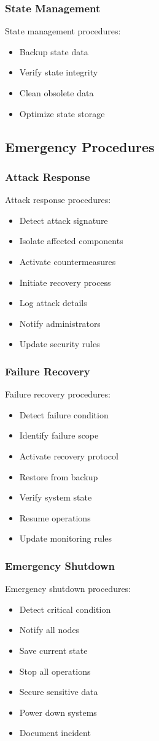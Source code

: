 \documentclass[12pt]{article}
\begin{document}
\subsubsection{State Management}
State management procedures:
\begin{itemize}
\item Backup state data
\item Verify state integrity
\item Clean obsolete data
\item Optimize state storage
\end{itemize}
\subsection{Emergency Procedures}
\subsubsection{Attack Response}
Attack response procedures:
\begin{itemize}
\item Detect attack signature
\item Isolate affected components
\item Activate countermeasures
\item Initiate recovery process
\item Log attack details
\item Notify administrators
\item Update security rules
\end{itemize}
\subsubsection{Failure Recovery}
Failure recovery procedures:
\begin{itemize}
\item Detect failure condition
\item Identify failure scope
\item Activate recovery protocol
\item Restore from backup
\item Verify system state
\item Resume operations
\item Update monitoring rules
\end{itemize}
\subsubsection{Emergency Shutdown}
Emergency shutdown procedures:
\begin{itemize}
\item Detect critical condition
\item Notify all nodes
\item Save current state
\item Stop all operations
\item Secure sensitive data
\item Power down systems
\item Document incident
\end{itemize}
\end{document}
